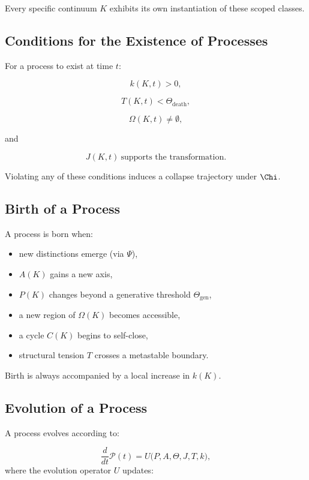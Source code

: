 Every specific continuum $K$ exhibits its own instantiation of these
scoped classes.

\subsection{Conditions for the Existence of Processes}

For a process to exist at time $t$:

\[
k(K,t) > 0,
\]

\[
T(K,t) < \Theta_{\mathrm{death}},
\]

\[
\Omega(K,t) \neq \emptyset,
\]

and

\[
J(K,t) \ \text{supports the transformation}.
\]

Violating any of these conditions induces a collapse trajectory under $\Chi$.

\subsection{Birth of a Process}

A process is born when:

\begin{itemize}
    \item new distinctions emerge (via $\Psi$),
    \item $A(K)$ gains a new axis,
    \item $P(K)$ changes beyond a generative threshold $\Theta_{\mathrm{gen}}$,
    \item a new region of $\Omega(K)$ becomes accessible,
    \item a cycle $C(K)$ begins to self-close,
    \item structural tension $T$ crosses a metastable boundary.
\end{itemize}

Birth is always accompanied by a local increase in $k(K)$.

\subsection{Evolution of a Process}

A process evolves according to:

\[
\frac{d}{dt}\mathcal{P}(t)
= U\bigl(P, A, \Theta, J, T, k\bigr),
\]
where the evolution operator $U$ updates:

